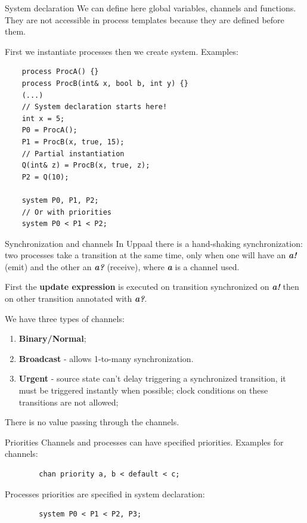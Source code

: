 \documentclass{beamer}
\begin{document}
\begin{frame}[fragile]{System declaration}
	We can define here global variables, channels and functions. They are not accessible in process templates because they are defined before them.
	
	First we instantiate processes then we create system. Examples:
	
	\tiny{
	\begin{verbatim}
	process ProcA() {}
	process ProcB(int& x, bool b, int y) {}
	(...)
	// System declaration starts here!
	int x = 5;
	P0 = ProcA();
	P1 = ProcB(x, true, 15);
	// Partial instantiation
	Q(int& z) = ProcB(x, true, z);
	P2 = Q(10);
	
	system P0, P1, P2;
	// Or with priorities
	system P0 < P1 < P2;
	\end{verbatim}}
\end{frame}

\begin{frame}{Synchronization and channels}
	In Uppaal there is a hand-shaking synchronization: two processes take a transition at the same time, only when one will have an \textit{\textbf{a!}} (emit) and the other an \textit{\textbf{a?}} (receive), where \textit{\textbf{a}} is a channel used.\newline
	
	First the \textbf{update expression} is executed on transition synchronized on \textit{\textbf{a!}} then on other transition annotated with \textit{\textbf{a?}}.
	
	We have three types of channels:
	\begin{enumerate}
		\item \textbf{Binary/Normal};
		\item \textbf{Broadcast} - allows 1-to-many synchronization.
		\item \textbf{Urgent} - source state can't delay triggering a synchronized transition, it must be triggered instantly when possible; clock conditions on these transitions are not allowed;
	\end{enumerate}
	
	There is no value passing through the channels.
	
\end{frame}

\begin{frame}[fragile]{Priorities}
	Channels and processes can have specified priorities. Examples for channels:
	
	\begin{verbatim}
		chan priority a, b < default < c;
	\end{verbatim}
	
	Processes priorities are specified in system declaration:
	
	\begin{verbatim}
		system P0 < P1 < P2, P3;
	\end{verbatim}
\end{frame}
\end{document}
